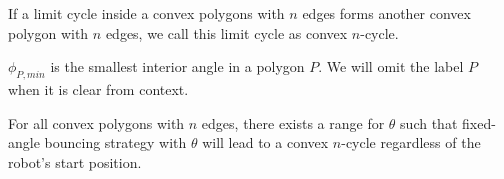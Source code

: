 \documentclass[]{styles/svproc}  %
\begin{document}
\begin{definition}
If a limit cycle inside a convex polygons with $n$ edges forms another convex
polygon with $n$ edges, we call this limit cycle as convex $n$-cycle.
\end{definition}

\begin{definition}
$\phi_{P,min}$ is the smallest interior angle in a polygon $P$. We will omit the
label $P$ when it is clear from context.
\end{definition}

\begin{theorem} \label{thm:convex}
For all convex polygons with $n$ edges, there exists a range for $\theta$ such that fixed-angle bouncing strategy with $\theta$ will lead to a convex $n$-cycle regardless of the robot's start position.
\end{theorem}
\end{document}
